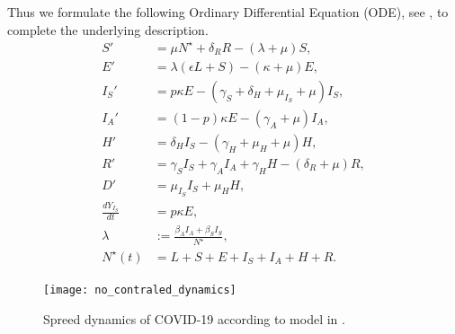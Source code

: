 Thus we formulate the following Ordinary Differential Equation (ODE), see
, to complete the underlying description.
\begin{equation}
	\label{eqn:base_dynamics}
    \begin{aligned}
        S' & =
            \mu N^\star + \delta_R R - (\lambda + \mu)
            S,
        \\
        E' & =
            \lambda (\epsilon L + S) - (\kappa + \mu) E,
        \\
        I_S' & =
            p \kappa E -
            (\gamma_S +
                \delta_H +
                \mu_{I_S} +
                \mu) I_S,
        \\
        I_A' &=
            (1 - p) \kappa E - (\gamma_A + \mu) I_A,
        \\
        H' &=
            \delta_H I_S - (\gamma_H + \mu_H + \mu) H,
        \\
        R' & =
            \gamma_S I_S + \gamma_A I_A + \gamma_H H - (\delta_R + \mu) R,
        \\
        D' &=
            \mu_{I_S} I_S + \mu_H H,
        \\
        \frac{dY_{I_S}}{dt} &  = p \kappa E,
        \\
        \lambda &:=
            \frac{\beta_A I_A + \beta_S I_S}{N^{\star}},
        \\
        N^{\star}(t) &=
            L + S + E +
            I_S + I_A +
            H + R .
    \end{aligned}
\end{equation}
%
\begin{figure}
    \begin{center}
        \texttt{[image: no\_contraled\_dynamics]}
    \end{center}
    \caption{
        Spreed dynamics of COVID-19 according to model in
        .
    }
    \label{fig:base_dynamics}
\end{figure}

